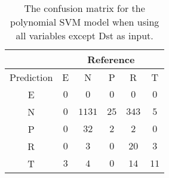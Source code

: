 \begin{table}[!ht]
	\centering
	\begin{tabular}{|c|c|c|c|c|c|}
		\hline
		 & \multicolumn{5}{|c|}{Reference} \\ \hline
		 Prediction & E & N & P & R & T \\ \hline
		 E & $0$ & $0$ & $0$ & $0$ & $0$ \\ \hline
		 N & $0$ & $1131$ & $25$ & $343$ & $5$ \\ \hline
		 P & $0$ & $32$ & $2$ & $2$ & $0$ \\ \hline
		 R & $0$ & $3$ & $0$ & $20$ & $3$ \\ \hline
		 T & $3$ & $4$ & $0$ & $14$ & $11$ \\ \hline
	\end{tabular}
	\caption{The confusion matrix for the polynomial SVM model when using all variables except Dst as input.}
	\label{tab:cm:noDst:svmPoly}
\end{table}
